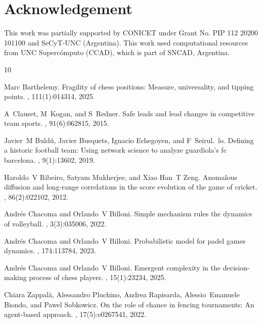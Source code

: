 \documentclass[preprint, amsmath,amssymb, pre]{revtex4-2}
\begin{document}
\section*{Acknowledgement} 
This work was partially supported by CONICET under Grant No. PIP 112 20200 101100 and SeCyT-UNC (Argentina).
This work used computational resources from UNC Supercómputo (CCAD), which is part of SNCAD, Argentina.


%
%

\begin{thebibliography}{10}

Marc Barthelemy.
\newblock Fragility of chess positions: Measure, universality, and tipping
  points.
, 111(1):014314, 2025.

A~Clauset, M~Kogan, and S~Redner.
\newblock Safe leads and lead changes in competitive team sports.
, 91(6):062815, 2015.

Javier~M Buld{\'u}, Javier Busquets, Ignacio Echegoyen, and F~Seirul.~lo.
\newblock Defining a historic football team: Using network science to analyze
  guardiola’s fc barcelona.
, 9(1):13602, 2019.

Haroldo~V Ribeiro, Satyam Mukherjee, and Xiao Han~T Zeng.
\newblock Anomalous diffusion and long-range correlations in the score
  evolution of the game of cricket.
, 86(2):022102, 2012.

Andr{\'e}s Chacoma and Orlando~V Billoni.
\newblock Simple mechanism rules the dynamics of volleyball.
, 3(3):035006, 2022.

Andr{\'e}s Chacoma and Orlando~V Billoni.
\newblock Probabilistic model for padel games dynamics.
, 174:113784, 2023.

Andr{\'e}s Chacoma and Orlando~V Billoni.
\newblock Emergent complexity in the decision-making process of chess players.
, 15(1):23234, 2025.

Chiara Zappal{\`a}, Alessandro Pluchino, Andrea Rapisarda, Alessio~Emanuele
  Biondo, and Pawel Sobkowicz.
\newblock On the role of chance in fencing tournaments: An agent-based
  approach.
, 17(5):e0267541, 2022.


\end{thebibliography}
\end{document}
